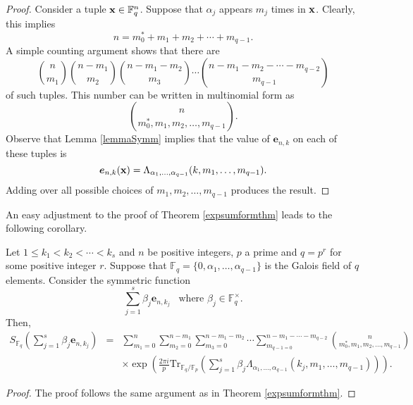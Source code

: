 \begin{proof}
 Consider a tuple ${\bf x} \in \mathbb{F}_q^n$.  Suppose that $\alpha_j$ appears $m_j$ times in ${\bf x}$.  Clearly,
 this implies
 $$n=m_0^*+m_1+m_2+\cdots+m_{q-1}.$$
 A simple counting argument shows that there are
 \begin{equation}
 \label{multbinom}
  \binom{n}{m_1}\binom{n-m_1}{m_2}\binom{n-m_1-m_2}{m_3}\cdots \binom{n-m_1-m_2-\cdots-m_{q-2}}{m_{q-1}}
 \end{equation}
of such tuples.  This number can be written in multinomial form as
\begin{equation}
 {n\choose m_0^*,m_1,m_2,\ldots, m_{q-1}}.
\end{equation}
Observe that Lemma \ref{lemmaSymm} implies that the value of $\boldsymbol{e}_{n,k}$ on each of these tuples is 
\begin{equation}
 \boldsymbol{e}_{n,k}({\bf x})=\Lambda_{\alpha_1,\ldots, \alpha_{q-1}}(k,m_1,\ldots, m_{q-1}).
\end{equation}
Adding over all possible choices of $m_{1},m_{2},\ldots, m_{q-1}$ produces the result.
\end{proof}
An easy adjustment to the proof of Theorem \ref{expsumformthm} leads to the following corollary.

\begin{corollary}
\label{expsumformcoro}
Let $1\leq k_1<k_2<\cdots<k_s$ and $n$ be positive integers, $p$ a prime and $q=p^r$ for some positive integer $r$. Suppose that $\mathbb{F}_q=\{0,\alpha_1,\ldots, \alpha_{q-1}\}$ is the Galois field of $q$ elements. 
Consider the symmetric function
$$\sum_{j=1}^s \beta_j \boldsymbol{e}_{n,k_j}\,\,\, \text{ where }\beta_j\in \mathbb{F}_q^{\times}.$$
Then,
\begin{eqnarray*}
S_{\mathbb{F}_q}\left(\sum_{j=1}^s \beta_j\boldsymbol{e}_{n,k_j}\right)&=&\sum_{m_1=0}^n \sum_{m_2=0}^{n-m_1}\sum_{m_3=0}^{n-m_1-m_{2}}\cdots\sum_{m_{q-1=0}}^{n-m_{1}-\cdots-m_{q-2}} {n\choose m_0^*,m_1,m_2,\ldots, m_{q-1}}\\
&& \times \exp\left(\frac{2\pi i}{p} \text{Tr}_{\mathbb{F}_q/\mathbb{F}_p}\left(\sum_{j=1}^s \beta_j\Lambda_{\alpha_1,\ldots, \alpha_{q-1}}(k_j,m_1,\ldots, m_{q-1})\right)\right).
\end{eqnarray*}
\end{corollary}

\begin{proof}
 The proof follows the same argument as in Theorem \ref{expsumformthm}.
\end{proof}

